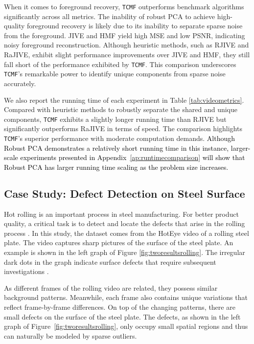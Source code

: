\documentclass[twoside,11pt]{article}
\def\name{\texttt{TCMF}\xspace}
\newcommand{\revise}[1]{\textcolor{black}{ #1}}
\begin{document}
When it comes to foreground recovery, \name outperforms benchmark algorithms significantly across all metrics. The inability of robust PCA to achieve high-quality foreground recovery is likely due to its inability to separate sparse noise from the foreground. JIVE and HMF yield high MSE and low PSNR, indicating noisy foreground reconstruction. Although heuristic methods, such as RJIVE and RaJIVE, exhibit slight performance improvements over JIVE and HMF, they still fall short of the performance exhibited by \name. This comparison underscores \name's remarkable power to identify unique components from sparse noise accurately.

We also report the running time of each experiment in Table \ref{tab:videometrics}. Compared with heuristic methods to robustly separate the shared and unique components, \name exhibits a slightly longer running time than RJIVE but significantly outperforms RaJIVE in terms of speed. The comparison highlights \name's superior performance with moderate computation demands. \revise{Although Robust PCA demonstrates a relatively short running time in this instance, larger-scale experiments presented in Appendix~\ref{ap:runtimecomparison}
 will show that Robust PCA has larger running time scaling as the problem size increases. }

\subsection{Case Study: Defect Detection on Steel Surface}

Hot rolling is an important process in steel manufacturing. For better product quality, a critical task is to detect and locate the defects that arise in the rolling process \citep{datasetoriginal}. In this study, the dataset \citep{datasetoriginal,haodataset} comes from the HotEye video of a rolling steel plate. The video captures sharp pictures of the surface of the steel plate. An example is shown in the left graph of Figure \ref{fig:tworesultsrolling}. The irregular dark dots in the graph indicate surface defects that require subsequent investigations \citep{datasetoriginal}.

As different frames of the rolling video are related, they possess similar background patterns. Meanwhile, each frame also contains unique variations that reflect frame-by-frame differences. On top of the changing patterns, there are small defects on the surface of the steel plate. The defects, as shown in the left graph of Figure~\ref{fig:tworesultsrolling}, only occupy small spatial regions and thus can naturally be modeled by sparse outliers.  
\end{document}
